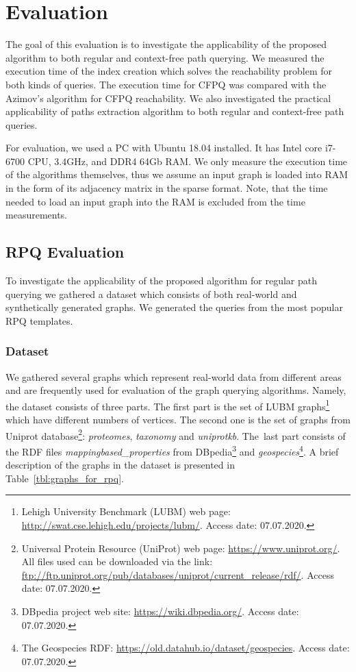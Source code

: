 \section{Evaluation}

The goal of this evaluation is to investigate the applicability of the proposed algorithm to both regular and context-free path querying.
We measured the execution time of the index creation which solves the reachability problem for both kinds of queries.
The execution time for CFPQ was compared with the Azimov's algorithm for CFPQ reachability.
We also investigated the practical applicability of paths extraction algorithm to both regular and context-free path queries.

For evaluation, we used a PC with Ubuntu 18.04 installed.
It has Intel core i7-6700 CPU, 3.4GHz, and DDR4 64Gb RAM.
We only measure the execution time of the algorithms themselves, thus we assume an input graph is loaded into RAM in the form of its adjacency matrix in the sparse format.
Note, that the time needed to load an input graph into the RAM is excluded from the time measurements.

\subsection{RPQ Evaluation}

To investigate the applicability of the proposed algorithm for regular path querying we gathered a dataset which consists of both real-world and synthetically generated graphs.
We generated the queries from the most popular RPQ templates.

\subsubsection{Dataset}

We gathered several graphs which represent real-world data from different areas and are frequently used for evaluation of the graph querying algorithms.
Namely, the dataset consists of three parts.
The first part is the set of LUBM graphs\footnote{Lehigh University Benchmark (LUBM) web page: \url{http://swat.cse.lehigh.edu/projects/lubm/}. Access date: 07.07.2020.}~\citep{10.1016/j.websem.2005.06.005} which have different numbers of vertices.
The second one is the set of graphs from Uniprot database\footnote{Universal Protein Resource (UniProt) web page: \url{https://www.uniprot.org/}. All files used can be downloaded via the link: \url{ftp://ftp.uniprot.org/pub/databases/uniprot/current_release/rdf/}. Access date: 07.07.2020.}: \textit{proteomes}, \textit{taxonomy} and \textit{uniprotkb}.
The~last part consists of the RDF files \textit{mappingbased\_properties} from DBpedia\footnote{DBpedia project web site: \url{https://wiki.dbpedia.org/}. Access date: 07.07.2020.} and \textit{geospecies}\footnote{The Geospecies RDF: \url{https://old.datahub.io/dataset/geospecies}. Access date: 07.07.2020.}.
A brief description of the graphs in the dataset is presented in Table~\ref{tbl:graphs_for_rpq}.

